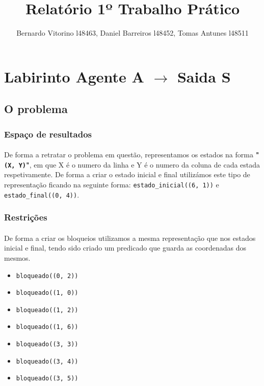 \documentclass{article}
\title{Relatório 1º Trabalho Prático}
\author{Bernardo Vitorino l48463, Daniel Barreiros l48452, Tomas Antunes l48511}
\begin{document}
\maketitle

\section{Labirinto Agente A $\rightarrow$ Saida S}
\subsection{O problema}
\subsubsection{Espaço de resultados}

\paragraph{}De forma a retratar o problema em questão, representamos os estados na forma \textbf{"\texttt{(X, Y)}"}, em que X é o numero da linha e Y é o numero da coluna de cada estada respetivamente. De forma a criar o estado inicial e final utilizámos este tipo de representação ficando na seguinte forma: \texttt{estado\_inicial((6, 1))} e \texttt{estado\_final((0, 4))}.

\subsubsection{Restrições}
\paragraph{} De forma a criar os bloqueios utilizamos a mesma representação que nos estados inicial e final, tendo sido criado um predicado que guarda as coordenadas dos mesmos. 

\begin{itemize}
  \item \texttt{bloqueado((0, 2))}
  \item \texttt{bloqueado((1, 0))}
  \item \texttt{bloqueado((1, 2))}
  \item \texttt{bloqueado((1, 6))}
  \item \texttt{bloqueado((3, 3))}
  \item \texttt{bloqueado((3, 4))}
  \item \texttt{bloqueado((3, 5))}
\end{itemize}
\end{document}
